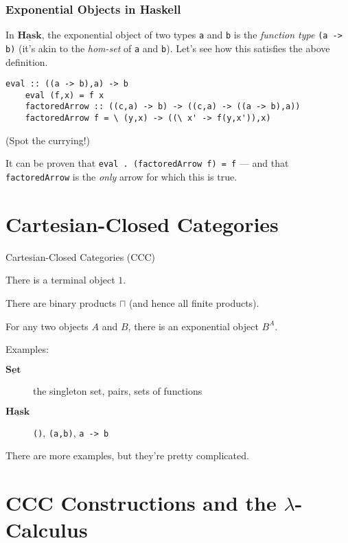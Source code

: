 \documentclass[10pt]{beamer}
\newcommand{\Cat}[1]{\ensuremath{\underline{\mathbf{#1}}}}
\theoremstyle{definition}
\theoremstyle{remark}
\numberwithin{equation}{section}
\begin{document}
\begin{frame}
  \frametitle{Exponential Objects in Haskell}

  In $\Cat{Hask}$, the exponential object of two types \lstinline{a} and
  \lstinline{b} is the \emph{function type} \lstinline{(a -> b)} (it's akin to
  the \emph{hom-set} of \lstinline{a} and \lstinline{b}). Let's see
  how this satisfies the above definition.

  \begin{lstlisting}[frame=single]
    eval :: ((a -> b),a) -> b
    eval (f,x) = f x
    factoredArrow :: ((c,a) -> b) -> ((c,a) -> ((a -> b),a))
    factoredArrow f = \ (y,x) -> ((\ x' -> f(y,x')),x)
  \end{lstlisting}
  {\footnotesize{(Spot the currying!)}}

  It can be proven that \lstinline{eval . (factoredArrow f) = f} --- and that
  \lstinline{factoredArrow} is the \emph{only} arrow for which this is true.

\end{frame}

\section{Cartesian-Closed Categories}

\begin{frame}[fragile]{Cartesian-Closed Categories (CCC)}

  There is a terminal object $1$.

  There are binary products $\sqcap$ (and hence all finite products).

  For any two objects $A$ and $B$, there is an exponential object $B^A$.

  Examples:
  \begin{description}
    \item[\Cat{Set}] the singleton set, pairs, sets of functions
    \item[\Cat{Hask}] \lstinline{()}, \lstinline{(a,b)}, \lstinline{a -> b}
  \end{description}

  There are more examples, but they're pretty complicated.

\end{frame}

\section{CCC Constructions and the $\lambda$-Calculus} %
\end{document}
